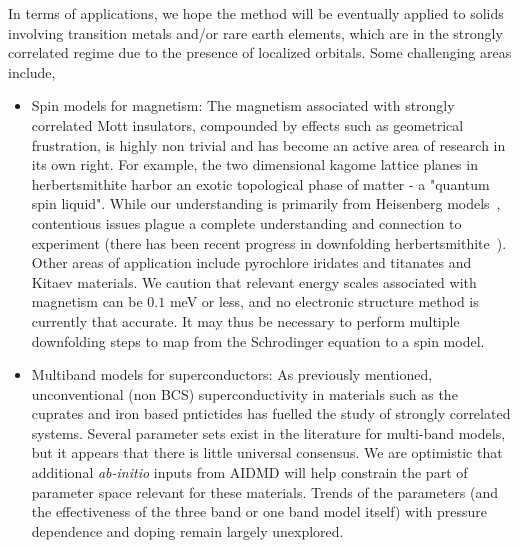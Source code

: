 \documentclass[prl,12pt,onecolumn,nofootinbib,notitlepage,english,superscriptaddress]{revtex4-1}
\newcommand{\HJC}[1]{{\color{RED}{\bf HJC: #1}}}
\begin{document}
In terms of applications, we hope the method will be eventually applied to solids involving transition 
metals and/or rare earth elements, which are in the strongly correlated regime due to the presence of localized orbitals. 
Some challenging areas include,
\begin{itemize} 
	\item Spin models for magnetism: 
	The magnetism associated with strongly correlated Mott insulators, compounded by effects such as geometrical frustration, 
	is highly non trivial and has become an active area of research in its own right. 
	For example, the two dimensional kagome lattice planes in 
	herbertsmithite harbor an exotic topological phase of matter - a "quantum spin liquid". While our understanding is primarily 
	from Heisenberg models~\cite{Yan_Huse_White, Changlani_kagome}, 
	contentious issues plague a complete understanding and connection to experiment (there has been recent progress 
	in downfolding herbertsmithite~\cite{Jeschke}). 
	Other areas of application include pyrochlore iridates and titanates and Kitaev materials. 
	We caution that relevant energy scales associated with magnetism can be $0.1$ meV or less, and no electronic structure 
	method is currently that accurate. It may thus be necessary to perform multiple downfolding steps to map from 
	the Schrodinger equation to a spin model.
	\item Multiband models for superconductors:
	As previously mentioned, unconventional (non BCS) superconductivity in materials such as the cuprates and iron based 
	pntictides has fuelled the study of strongly correlated systems.
	Several parameter sets exist in the literature for multi-band models, but it appears that there is little universal consensus. 
	We are optimistic that additional \emph{ab-initio} inputs from AIDMD will help constrain the part of parameter 
	space relevant for these materials. Trends of the parameters (and the effectiveness of the three band 
	or one band model itself) with pressure dependence and doping remain largely unexplored.  
\end{itemize} 




\end{document}
